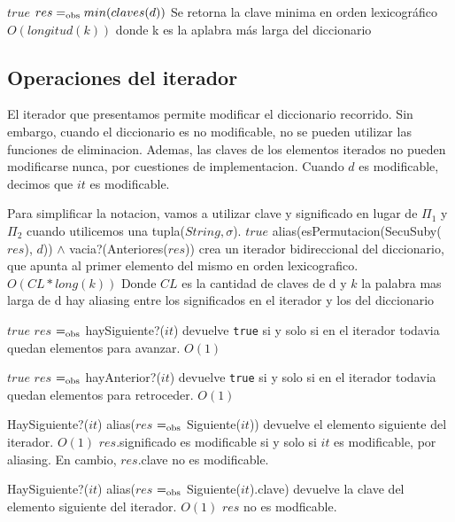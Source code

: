  {$true$}
 {$res =_{\mathrm{obs}} min(claves(d))$}
 {Se retorna la clave minima en orden lexicográfico}
 {$O(longitud(k))$ donde k es la aplabra más larga del diccionario}
 {}

 
  \subsection{Operaciones del iterador}

  El iterador que presentamos permite modificar el diccionario recorrido.  Sin embargo, cuando el diccionario es no modificable, no se pueden utilizar las funciones de eliminacion.  Ademas, las claves de los elementos iterados no pueden modificarse nunca, por cuestiones de implementacion.  Cuando $d$ es modificable, decimos que $it$ es modificable.
  

  Para simplificar la notacion, vamos a utilizar clave y significado en lugar de $\Pi_1$ y $\Pi_2$ cuando utilicemos una tupla($String,\sigma$).
 {$true$}
 {alias(esPermutacion(SecuSuby($res$), $d$)) $\land$ vacia?(Anteriores($res$))}
 {crea un iterador bidireccional del diccionario, que apunta al primer elemento del mismo en orden lexicografico.}
  {$O(CL*long(k))$ Donde $CL$ es la cantidad de claves de d y $k$ la palabra mas larga de d}
  {hay aliasing entre los significados en el iterador y los del diccionario}


	{$true$}  
  {$res$ $=_{\mathrm{obs}}$ haySiguiente?($it$)}
  {devuelve \texttt{true} si y solo si en el iterador todavia quedan elementos para avanzar.}
  {$O(1)$}
  {}

	{$true$}    
  {$res$ $=_{\mathrm{obs}}$ hayAnterior?($it$)}
  {devuelve \texttt{true} si y solo si en el iterador todavia quedan elementos para retroceder.}
  {$O(1)$}
  {}

  {HaySiguiente?($it$)}
  {alias($res$ $=_{\mathrm{obs}}$ Siguiente($it$))}
  {devuelve el elemento siguiente del iterador.}
  {$O(1)$}
  {$res$.significado es modificable si y solo si $it$ es modificable, por aliasing.  En cambio, $res$.clave no es modificable.}
  
  {HaySiguiente?($it$)}
  {alias($res$ $=_{\mathrm{obs}}$ Siguiente($it$).clave)}
  {devuelve la clave del elemento siguiente del iterador.}
  {$O(1)$}
  {$res$ no es modficable.}

